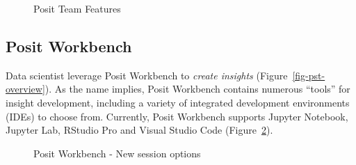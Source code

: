\documentclass[
  letterpaper,
  DIV=11,
  numbers=noendperiod]{scrreprt}
\begin{document}
\begin{figure}


\caption{\label{fig-pst-features}Posit Team Features}

\end{figure}%

\subsection{Posit Workbench}\label{posit-workbench}

Data scientist leverage Posit Workbench to \emph{create insights}
(Figure~\ref{fig-pst-overview}). As the name implies, Posit Workbench
contains numerous ``tools'' for insight development, including a variety
of integrated development environments (IDEs) to choose from. Currently,
Posit Workbench supports Jupyter Notebook, Jupyter Lab, RStudio Pro and
Visual Studio Code (Figure~\ref{fig-pw-new-session}).

\begin{figure}


\caption{\label{fig-pw-new-session}Posit Workbench - New session
options}

\end{figure}%
\end{document}
